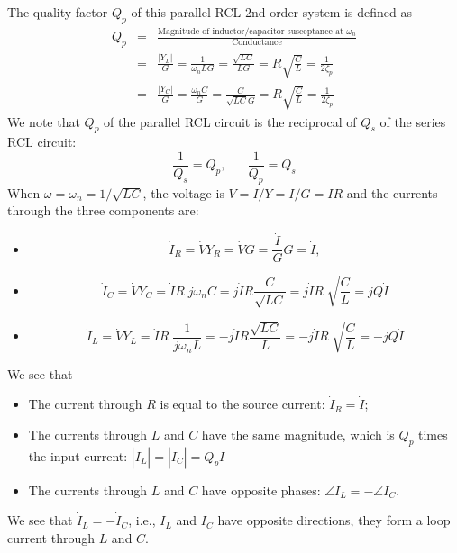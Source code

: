 \documentclass{article}
\begin{document}
The quality factor $Q_p$ of this parallel RCL 2nd order system is 
defined as
\begin{eqnarray}
  Q_p&=&
  \frac{\mbox{Magnitude of inductor/capacitor susceptance at $\omega_n$}}
       {\mbox{Conductance}}
  \nonumber \\
  &=&\frac{|Y_L|}{G}=\frac{1}{\omega_nLG}=\frac{\sqrt{LC}}{LG}
  =R\sqrt{\frac{C}{L}}=\frac{1}{2\zeta_p}
  \nonumber \\
  &=&\frac{|Y_C|}{G}=\frac{\omega_n C}{G}=\frac{C}{\sqrt{LC}G}
  =R\sqrt{\frac{C}{L}}=\frac{1}{2\zeta_p}
\end{eqnarray}
We note that $Q_p$ of the parallel RCL circuit is the reciprocal of $Q_s$ of
the series RCL circuit:
\begin{equation} 
  \frac{1}{Q_s}=Q_p,\;\;\;\;\;\;\frac{1}{Q_p}=Q_s
\end{equation}
When $\omega=\omega_n=1/\sqrt{LC}$, the voltage is 
$\dot{V}=\dot{I}/Y=\dot{I}/G=\dot{I}R$
and the currents through the three components are:
\begin{itemize}
\item 
\begin{equation}
  \dot{I}_R=\dot{V}Y_R=\dot{V}G=\frac{\dot I}{G} G=\dot{I},
\end{equation}
\item 
\begin{equation}
  \dot{I}_C=\dot{V} Y_C=\dot{I}R\;j\omega_n C=j\dot{I}R\frac{C}{\sqrt{LC}}
  =j \dot{I} R\;\sqrt{\frac{C}{L}}=jQ\dot{I}	
\end{equation}
\item 
\begin{equation}
  \dot{I}_L=\dot{V} Y_L=\dot{I}R\;\frac{1}{j\omega_n L}
  =-j\dot{I}R\frac{\sqrt{LC}}{L}=-j \dot{I} R\;\sqrt{\frac{C}{L}}=-jQ\dot{I}	
\end{equation}
\end{itemize}
We see that 
\begin{itemize}
\item The current through $R$ is equal to the source current: 
  $\dot{I}_R=\dot{I}$;
\item The currents through $L$ and $C$ have the same magnitude, 
  which is $Q_p$ times the input current: 
  $|\dot{I}_L|=|\dot{I}_C|=Q_p\dot{I}$
\item The currents through $L$ and $C$ have opposite phases:
  $\angle I_L=-\angle I_C$. 
\end{itemize}
We see that $\dot{I}_L=-\dot{I}_C$, i.e., $I_L$ and $I_C$ have 
opposite directions, they form a loop current through $L$ and $C$.
\end{document}
